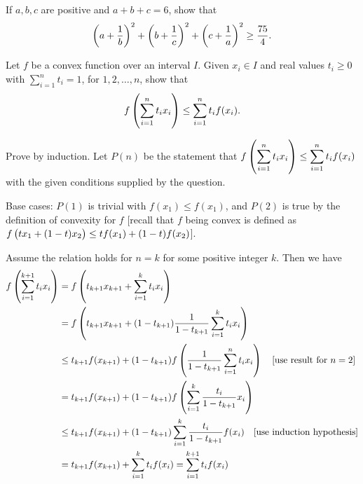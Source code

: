 \begin{prbm}
If $a,b,c$ are positive and $a+b+c=6$, show that
\[ \left(a+\frac{1}{b}\right)^2+\left(b+\frac{1}{c}\right)^2+\left(c+\frac{1}{a}\right)^2\ge\frac{75}{4}. \]
\end{prbm}

\begin{solution}
\end{solution}
\pagebreak

\begin{prbm}
Let $f$ be a convex function over an interval $I$. Given $x_i\in I$ and real values $t_i\ge0$ with $\sum_{i=1}^nt_i=1$, for $1,2,\dots,n$, show that 
\[ f\left(\sum_{i=1}^nt_ix_i\right)\le\sum_{i=1}^nt_if(x_i). \]
\end{prbm}

\begin{solution}
Prove by induction. Let $P(n)$ be the statement that $\displaystyle f\left(\sum_{i=1}^nt_ix_i\right)\le\sum_{i=1}^nt_if(x_i)$ with the given conditions supplied by the question.

Base cases: $P(1)$ is trivial with $f(x_1)\le f(x_1)$, and $P(2)$ is true by the definition of convexity for $f$ [recall that $f$ being convex is defined as $f\left(tx_1+(1-t)x_2\right)\le tf(x_1)+(1-t)f(x_2)$].

Assume the relation holds for $n=k$ for some positive integer $k$. Then we have
\begin{align*}
f\left(\sum_{i=1}^{k+1}t_ix_i\right) &= f\left(t_{k+1}x_{k+1}+\sum_{i=1}^kt_ix_i\right) \\
&= f\left(t_{k+1}x_{k+1}+(1-t_{k+1})\frac{1}{1-t_{k+1}}\sum_{i=1}^kt_ix_i\right) \\
&\le t_{k+1}f(x_{k+1})+(1-t_{k+1})f\left(\frac{1}{1-t_{k+1}}\sum_{i=1}^nt_ix_i\right) \quad \text{[use result for $n=2$]} \\
&= t_{k+1}f(x_{k+1})+(1-t_{k+1})f\left(\sum_{i=1}^k\frac{t_i}{1-t_{k+1}}x_i\right) \\
&\le t_{k+1}f(x_{k+1})+(1-t_{k+1})\sum_{i=1}^k\frac{t_i}{1-t_{k+1}}f(x_i) \quad \text{[use induction hypothesis]} \\
&= t_{k+1}f(x_{k+1})+\sum_{i=1}^kt_if(x_i)=\sum_{i=1}^{k+1}t_if(x_i)
\end{align*}
\end{solution}
\pagebreak


